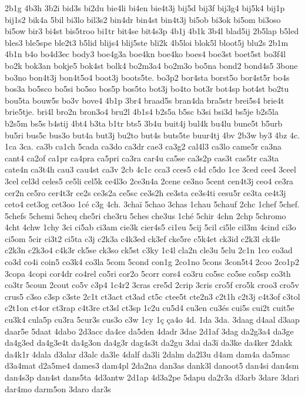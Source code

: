 {2b1g
4b3h
3b2i
bid3s
bi2du
bie4li
bi4en
bie4t3j
bij5d
bij3f
bij3g4
bij5k4
bij1p
bij1s2
bik4a
5bil
bi3lo
bil3s2
bin4dr
bin4st
bin4t3j
bi5ob
bi3ok
bi5om
bi3oso
bi5ow
bir3
bi4st
bis5troo
bi1tr
bit4se
bit4s3p
4b1j
4b1k
3b4l
blad5ij
2b5lap
b5led
bles3
ble5spe
ble2t3
b5lid
blijs4
blij5ste
bli2k
4b5loi
blok5l
bloot5j
blu2s
2b1m
4b1n
b4o
bo4d3ec
body3
boe4g3a
boe4kn
boe4ko
boes4
boe3st
boet5st
bo3f4l
bo2k
bok3an
bokje5
bok4st
bolk4
bo2m3a4
bo2m3o
bo5na
bond2
bond4s5
3bone
bo3no
bon4t3j
bon4t5o4
boot3j
boots5te.
bo3p2
bor4sta
borst5o
bor4st5r
bo4s
bos3a
bo5sco
bo5si
bo5so
bos5p
bos5to
bot3j
bo4to
bot3r
bot4sp
bot4st
bo2tu
bou5ta
bouw5s
bo3v
bove4
4b1p
3br4
braad5s
bran4da
bra5str
brei5s4
brie4t
brie5tje.
bri4l
bro2n
bron3o4
bru2l
4b1s4
b2s5a
b5sc
b3si
bsi3d
bs5je
b2s5la
b2s5m
bs5s
b4stij
4bt4
b3ta
b1tr
bts5
3b4u
buit4j
bul4k
bu4lu
bune5t
b5urb
bu5ri
bus5c
bus3o
but4a
but3j
bu2to
but4s
buts5te
buur4tj
4bv
2b3w
by3
4bz
4c.
1ca
3ca.
ca3b
ca1ch
5cada
ca3do
ca3dr
cae3
ca3g2
cal4l3
ca3lo
came5r
ca3na
cant4
ca2of
ca1pr
ca4pra
ca5pri
ca3ra
car4u
ca5se
ca3s2p
cas3t
cas5tr
ca3ta
cate4n
ca3t4h
cau3
cau4st
ca3v
2cb
4c1c
cca3
cces5
c4d
c5do
1ce
3ced
cee4
3ceel
3cel
cel3d
celes5
ce5li
cel5k
ce4l3o
2ce3n4a
2cene
ce3no
5cent
cen4t3j
ceo4
ce3ra
cer2n
ce5ro
cer4t3r
ce2s
ce3s2a
ce5sc
ce3s2h
ce3sta
ce3s4ti
cesu5r
ce3ta
ce4t3j
ceto4
cet3og
cet3oo
1cé
c3g
4ch.
3chaï
5chao
3chas
1chau
5chauf
2chc
1chef
5chef.
5chefs
5chemi
5cheq
che5ri
che3ru
5ches
che3us
1ché
5chir
4chn
2chp
5chromo
4cht
4chw
1chy
3ci
ci5ab
ci3am
cie3k
cier4s5
ci1eu
5cij
5cil
ci5le
cil3m
4cind
ci3o
ci5om
5cir
ci3t2
ci5ta
c3j
c2k3a
c4k3ed
ck3ef
cke5re
c5k4et
ck3id
c2k3l
ck4le
c2k3n
c2k3o4
c4k3r
ck5se
ck3so
ck5st
c3ky
1c4l
cla2n
cle3u
5clu
2c1n
1co
co3ad
co3d
co4i
coin5
co3k4
co3la
5com
5cond
con1g
2co1no
5cons
3con5t4
2coo
2co1p2
3copa
4copi
cor4dr
co4rel
co5ri
cor2o
5corr
cors4
co3ru
co5sc
co5se
co5sp
co3th
co3tr
5coun
2cout
co5v
c3p4
1c4r2
3cras
cre5d
2crip
3cris
cro5f
cro5k
croo3
cro5v
crus5
c3so
c3sp
c3ste
2c1t
ct3act
ct3ad
ct5c
ctee5t
cte2n3
c2t1h
c2t3j
c4t3of
c3tol
c2t1on
ct4or
ct3rap
c4t3re
ct3sl
ct3sp
1c2u
cu5d4
cu3en
cu3és
cui5s
cui2t
cuit5e
cu3k4
cula5p
cu3ra
5cur3s
cus3o
c3w
1cy
1ç
ça4o
4d.
1da
3da.
3daag
d4aal
d3aap
daar5e
5daat
4dabo
2d3acc
da4ce
da5den
4dadr
3dae
2d1af
3dag
da2g3a4
da3ge
da4g3ed
da4g3e4t
da4g3on
da4g3r
dag4s3t
da2gu
3dai
da3ï
da3ke
da4ker
2dakk
da4k1r
4dala
d3alar
d3alc
da3le
4dalf
da3li
2dalm
da2l3u
d4am
dam4a
da5mac
d3a4mat
d2a5me4
dames3
dam4pl
2da2na
dan3as
dank3l
danoot5
dan4si
dan4sm
dan4s3p
dan4st
dans5ta
4d3antw
2d1ap
4d3a2pe
5dapu
da2r3a
d3arb
3dare
3dari
dar4mo
darm5on
3daro
dar3s
}
